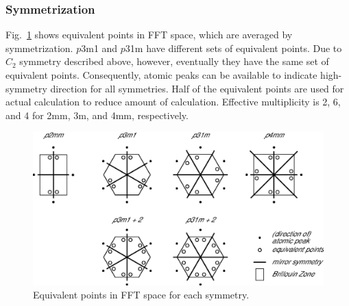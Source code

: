\documentclass[a4paper]{article}
\begin{document}
\subsubsection*{Symmetrization}
Fig.~\ref{fig:symmetry} shows equivalent points in FFT space, which are averaged by symmetrization.
$p$3m1 and $p$31m have different sets of equivalent points.
Due to $C_2$ symmetry described above, however, eventually they have the same set of equivalent points.
Consequently, atomic peaks can be available to indicate high-symmetry direction for all symmetries.
Half of the equivalent points are used for actual calculation to reduce amount of calculation.
Effective multiplicity is 2, 6, and 4 for 2mm, 3m, and 4mm, respectively.

\begin{figure}[h]
	\begin{center}
		\includegraphics[keepaspectratio]{symmetry.eps}
	\end{center}
	\caption{Equivalent points in FFT space for each symmetry.}
	\label{fig:symmetry}
\end{figure}
\end{document}
